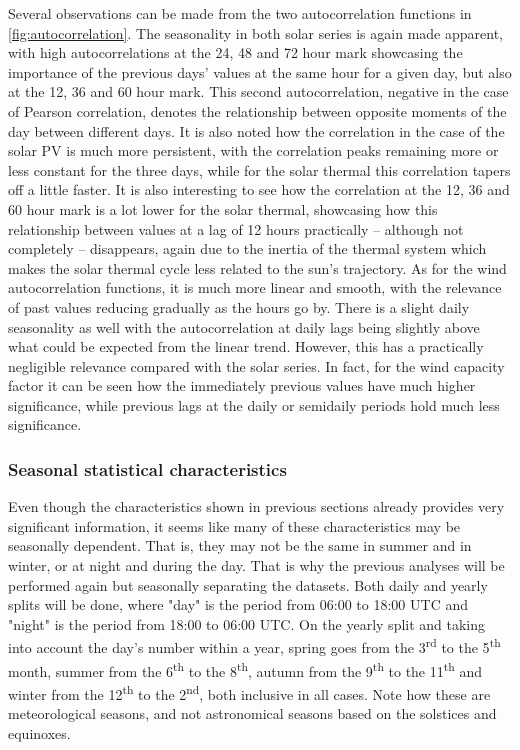 Several observations can be made from the two autocorrelation functions in \autoref{fig:autocorrelation}. The seasonality in both solar series is again made apparent, with high autocorrelations at the 24, 48 and 72 hour mark showcasing the importance of the previous days' values at the same hour for a given day, but also at the 12, 36 and 60 hour mark. This second autocorrelation, negative in the case of Pearson correlation, denotes the relationship between opposite moments of the day between different days. It is also noted how the correlation in the case of the solar PV is much more persistent, with the correlation peaks remaining more or less constant for the three days, while for the solar thermal this correlation tapers off a little faster. It is also interesting to see how the correlation at the 12, 36 and 60 hour mark is a lot lower for the solar thermal, showcasing how this relationship between values at a lag of 12 hours practically -- although not completely -- disappears, again due to the inertia of the thermal system which makes the solar thermal cycle less related to the sun's trajectory. As for the wind autocorrelation functions, it is much more linear and smooth, with the relevance of past values reducing gradually as the hours go by. There is a slight daily seasonality as well with the autocorrelation at daily lags being slightly above what could be expected from the linear trend. However, this has a practically negligible relevance compared with the solar series. In fact, for the wind capacity factor it can be seen how the immediately previous values have much higher significance, while previous lags at the daily or semidaily periods hold much less significance. 

\subsubsection{Seasonal statistical characteristics}
Even though the characteristics shown in previous sections already provides very significant information, it seems like many of these characteristics may be seasonally dependent. That is, they may not be the same in summer and in winter, or at night and during the day. That is why the previous analyses will be performed again but seasonally separating the datasets. Both daily and yearly splits will be done, where "day" is the period from 06:00 to 18:00 UTC and "night" is the period from 18:00 to 06:00 UTC. On the yearly split and taking into account the day's number within a year, spring goes from the 3\textsuperscript{rd} to the 5\textsuperscript{th} month, summer from the 6\textsuperscript{th} to the 8\textsuperscript{th}, autumn from the 9\textsuperscript{th} to the 11\textsuperscript{th} and winter from the 12\textsuperscript{th} to the 2\textsuperscript{nd}, both inclusive in all cases. Note how these are meteorological seasons, and not astronomical seasons based on the solstices and equinoxes. 

